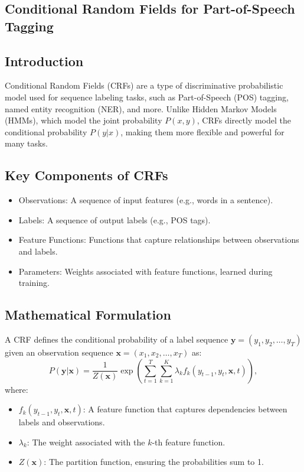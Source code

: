 \begin{notechapter}
\chapter{Conditional Random Fields for Part-of-Speech Tagging}\label{ch:crf}

\section{Introduction}
Conditional Random Fields (CRFs) are a type of 
discriminative probabilistic model used for sequence 
labeling tasks, such as Part-of-Speech (POS) tagging, 
named entity recognition (NER), and more. Unlike Hidden 
Markov Models (HMMs), which model the joint probability 
\( P(x, y) \), CRFs directly model the conditional 
probability \( P(y | x) \), making them more flexible 
and powerful for many tasks.

\section{Key Components of CRFs}
\begin{itemize}
    \item Observations: A sequence of input features 
          (e.g., words in a sentence).
    \item Labels: A sequence of output labels 
          (e.g., POS tags).
    \item Feature Functions: Functions that capture 
          relationships between observations and labels.
    \item Parameters: Weights associated with feature 
          functions, learned during training.
\end{itemize}

\section{Mathematical Formulation}
A CRF defines the conditional probability of a label 
sequence \( \mathbf{y} = (y_1, y_2, \dots, y_T) \) given 
an observation sequence \( \mathbf{x} = (x_1, x_2, \dots, 
x_T) \) as:
\[
P(\mathbf{y} | \mathbf{x}) = \frac{1}{Z(\mathbf{x})} 
\exp\left( \sum_{t=1}^T \sum_{k=1}^K \lambda_k f_k(y_{t-1}, 
y_t, \mathbf{x}, t) \right),
\]
where:
\begin{itemize}
    \item \( f_k(y_{t-1}, y_t, \mathbf{x}, t) \): A 
          feature function that captures dependencies 
          between labels and observations.
    \item \( \lambda_k \): The weight associated with 
          the \( k \)-th feature function.
    \item \( Z(\mathbf{x}) \): The partition function, 
          ensuring the probabilities sum to 1.
\end{itemize}


\end{notechapter}
